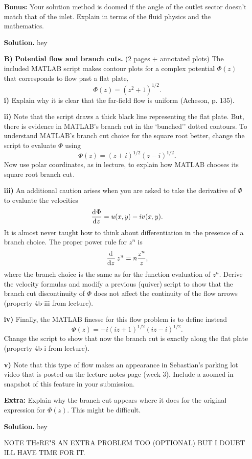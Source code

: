 \documentclass{article}
\begin{document}
\textbf{Bonus:} Your solution method is doomed if the angle of the
outlet sector doesn't match that of the inlet. Explain in terms of the
fluid physics and the mathematics.

\newpage

\textbf{Solution.} hey

\newpage

\textbf{B) Potential flow and branch cuts.} (2 pages + annotated plots)
The included MATLAB script makes contour plots for a complex potential
$\Phi(z)$ that corresponds to flow past a flat plate,
%
\begin{equation*}
    \Phi(z) = (z^2 + 1)^{1/2}
    .
\end{equation*}
%
\textbf{i)} Explain why it is clear that the far-field flow is
uniform (Acheson, p. 135).

\textbf{ii)} Note that the script draws a thick black line representing
the flat plate. But, there is evidence in MATLAB's branch cut in the
`bunched'' dotted contours. To understand MATLAB's branch cut choice for
the square root better, change the script to evaluate $\Phi$ using
%
\begin{equation*}
    \Phi(z) = (z + i)^{1/2} (z - i)^{1/2}
    .
\end{equation*}
%
Now use polar coordinates, as in lecture, to explain how MATLAB chooses
its square root branch cut.

\textbf{iii)} An additional caution arises when you are asked to take
the derivative of $\Phi$ to evaluate the velocities
%
\begin{equation*}
    \dod{\Phi}{z} = u(x, y) - i v(x, y)
    .
\end{equation*}
%
It is almost never taught how to think about differentiation in the
presence of a branch choice. The proper power rule for $z^n$ is
%
\begin{equation*}
    \dod{}{z} z^n = n \frac{z^n}{z}
    ,
\end{equation*}
%
where the branch choice is the same as for the function evaluation of
$z^n$. Derive the velocity formulas and modify a previous (quiver)
script to show that the branch cut discontinuity of $\Phi$ does not
affect the continuity of the flow arrows (property 4b-iii from lecture).

\textbf{iv)} Finally, the MATLAB finesse for this flow problem is to
define instead
%
\begin{equation*}
    \Phi(z) = -i (i z + 1)^{1/2} (i z - i)^{1/2}
    .
\end{equation*}
%
Change the script to show that now the branch cut is exactly along the
flat plate (property 4b-i from lecture).

\textbf{v)} Note that this type of flow makes an appearance in
Sebastian's parking lot video that is posted on the lecture notes page
(week 3). Include a zoomed-in snapshot of this feature in your
submission.

\textbf{Extra:} Explain why the branch cut appears where it does for the
original expression for $\Phi(z)$. This might be difficult.

\newpage

\textbf{Solution.} hey

NOTE THeRE"S AN EXTRA PROBLEM TOO (OPTIONAL) BUT I DOUBT ILL HAVE TIME FOR IT.
\end{document}
